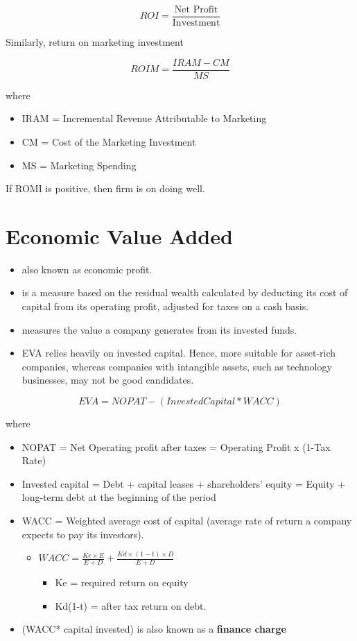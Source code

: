 \documentclass[
]{book}
\providecommand{\tightlist}{%
  \setlength{\itemsep}{0pt}\setlength{\parskip}{0pt}}
\begin{document}
\[
ROI = \frac{\text{Net Profit}}{\text{Investment}}
\]

Similarly, return on marketing investment

\[
ROIM = \frac{IRAM - CM}{MS}
\]

where

\begin{itemize}
\tightlist
\item
  IRAM = Incremental Revenue Attributable to Marketing
\item
  CM = Cost of the Marketing Investment
\item
  MS = Marketing Spending
\end{itemize}

If ROMI is positive, then firm is on doing well.

\hypertarget{economic-value-added}{%
\section{Economic Value Added}\label{economic-value-added}}

\begin{itemize}
\tightlist
\item
  also known as economic profit.
\item
  is a measure based on the residual wealth calculated by deducting its cost of capital from its operating profit,
  adjusted for taxes on a cash basis.
\item
  measures the value a company generates from its invested funds.
\item
  EVA relies heavily on invested capital. Hence, more suitable for asset-rich companies, whereas companies with
  intangible assets, such as technology businesses, may not be good candidates.
\end{itemize}

\[
EVA = NOPAT - (Invested Capital * WACC)
\]

where

\begin{itemize}
\item
  NOPAT = Net Operating profit after taxes = Operating Profit x (1-Tax Rate)
\item
  Invested capital = Debt + capital leases + shareholders' equity = Equity + long-term debt at the beginning of the
  period
\item
  WACC = Weighted average cost of capital (average rate of return a company expects to pay its investors).

  \begin{itemize}
  \item
    \(WACC = \frac{Ke \times E}{E+D} + \frac{Kd \times (1-t) \times D}{E +D }\)

    \begin{itemize}
    \tightlist
    \item
      Ke = required return on equity
    \item
      Kd(1-t) = after tax return on debt.
    \end{itemize}
  \end{itemize}
\item
  (WACC* capital invested) is also known as a \textbf{finance charge}
\end{itemize}
\end{document}
